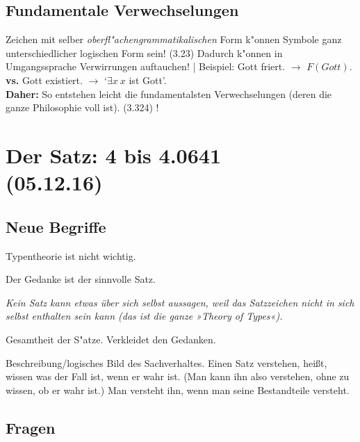 \documentclass[emulatestandardclasses]{scrartcl}
\begin{document}
\subsection{Fundamentale Verwechselungen}
Zeichen mit selber \emph{oberfl"achengrammatikalischen} Form k"onnen Symbole ganz unterschiedlicher logischen Form sein! (3.23) Dadurch k"onnen in Umgangssprache Verwirrungen auftauchen! | Beispiel: Gott friert. $\rightarrow$ $F(Gott)$. \textbf{vs.} Gott existiert.  $\rightarrow$ `$\exists x~x$ ist Gott'.\\

\noindent \textbf{Daher:} So entstehen leicht die fundamentalsten Verwechselungen (deren die ganze Philosophie voll ist). (3.324) !


\section{Der Satz: 4 bis 4.0641\\(05.12.16)}

\vspace{10pt}
\subsection{Neue Begriffe}

Typentheorie ist nicht wichtig.

\begin{description}[leftmargin=!,labelwidth=\widthof{\bfseries Typentheorie}]
  \item[Sinnvoll] Der Gedanke ist der sinnvolle Satz.
  \item[Unsinnig] 
  \item[Typentheorie] \emph{Kein Satz kann etwas über sich selbst aussagen, weil das Satzzeichen nicht in sich selbst enthalten sein kann (das ist die ganze »Theory of Types«).}
  \item[Sprache] Gesamtheit der S"atze. Verkleidet den Gedanken. 
  \item[Satz] Beschreibung/logisches Bild des Sachverhaltes. Einen Satz verstehen, heißt, wissen was der Fall ist, wenn er wahr ist. (Man kann ihn also verstehen, ohne zu wissen, ob er wahr ist.) Man versteht ihn, wenn man seine Bestandteile versteht.

\end{description}

\subsection{Fragen}
\end{document}

